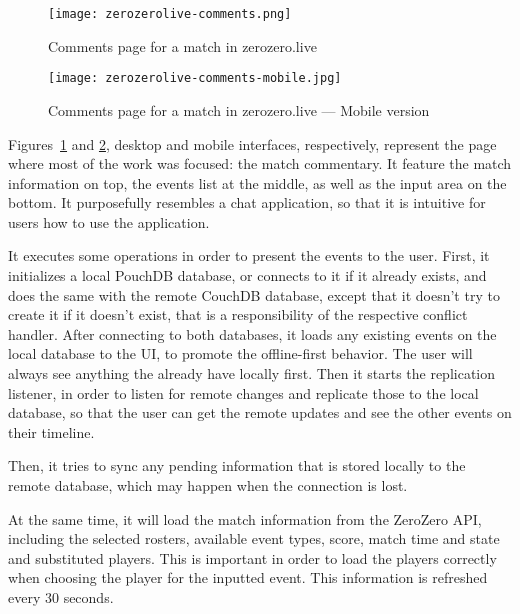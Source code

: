 \begin{figure}[ht]
    \begin{center}
        \leavevmode
        \texttt{[image: zerozerolive-comments.png]}
        \caption{Comments page for a match in zerozero.live}
        \label{fig:zerozerolive-comments}
    \end{center}
\end{figure}

\begin{figure}[ht]
    \begin{center}
        \leavevmode
        \texttt{[image: zerozerolive-comments-mobile.jpg]}
        \caption{Comments page for a match in zerozero.live --- Mobile version}
        \label{fig:zerozerolive-comments-mobile}
    \end{center}
\end{figure}

Figures~\ref{fig:zerozerolive-comments} and \ref{fig:zerozerolive-comments-mobile}, desktop and mobile interfaces, respectively, represent the page where most of the work was focused: the match commentary. It feature the match information on top, the events list at the middle, as well as the input area on the bottom. It purposefully resembles a chat application, so that it is intuitive for users how to use the application.

It executes some operations in order to present the events to the user. First, it initializes a local PouchDB database, or connects to it if it already exists, and does the same with the remote CouchDB database, except that it doesn't try to create it if it doesn't exist, that is a responsibility of the respective conflict handler. After connecting to both databases, it loads any existing events on the local database to the UI, to promote the offline-first behavior. The user will always see anything the already have locally first. Then it starts the replication listener, in order to listen for remote changes and replicate those to the local database, so that the user can get the remote updates and see the other events on their timeline.

Then, it tries to sync any pending information that is stored locally to the remote database, which may happen when the connection is lost.

At the same time, it will load the match information from the ZeroZero API, including the selected rosters, available event types, score, match time and state and substituted players. This is important in order to load the players correctly when choosing the player for the inputted event. This information is refreshed every 30 seconds.

